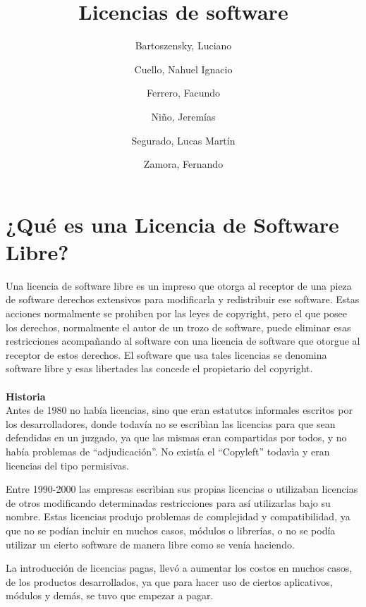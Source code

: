 \documentclass{article}
\title{Licencias de software}
\author{Bartoszensky, Luciano
\and
Cuello, Nahuel Ignacio
\and
Ferrero, Facundo
\and
Niño, Jeremías
\and
Segurado, Lucas Martín
\and
Zamora, Fernando
}
\begin{document}
\maketitle
\newpage
\tableofcontents
\newpage
\section{¿Qué es una Licencia de Software Libre?}

Una licencia de software libre es un impreso que otorga al receptor de una pieza de software derechos extensivos para modificarla y redistribuir ese software. Estas acciones normalmente se prohiben por las leyes de copyright, pero el que posee los derechos, normalmente el autor de un trozo de software, puede eliminar esas restricciones acompañando al software con una licencia de software que otorgue al receptor de estos derechos. El software que usa tales licencias se denomina software libre y esas libertades las concede el propietario del copyright.
\\
\\
{\bf Historia}
\\
Antes de 1980 no había licencias, sino que eran estatutos informales escritos por los desarrolladores, donde todavía no se escribìan las licencias para que sean defendidas en un juzgado, ya que las mismas eran compartidas por todos, y no había problemas de “adjudicación”.
No existía el “Copyleft” todavìa y eran licencias del tipo permisivas.

Entre 1990-2000 las empresas escrìbian sus propias licencias o utilizaban licencias de otros modificando determinadas restricciones para así utilizarlas bajo su nombre. 
Estas licencias produjo problemas de complejidad y compatibilidad, ya que no se podían incluir en muchos casos, módulos o librerías, o no se podía utilizar un cierto software de manera libre como se venía haciendo.

La introducción de licencias pagas, llevó a aumentar los costos en muchos casos, de los productos desarrollados, ya que para hacer uso de ciertos aplicativos, módulos y demás, se tuvo que empezar a pagar.
\newpage
\end{document}
